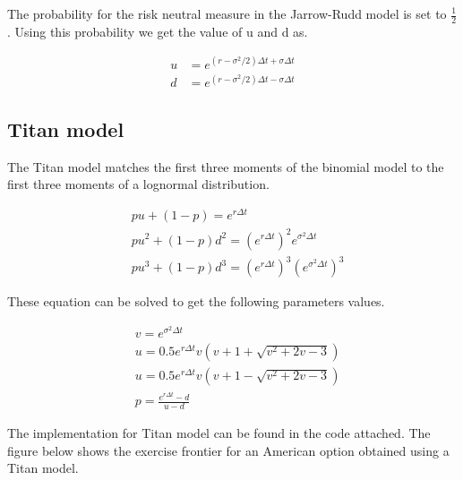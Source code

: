 \documentclass[12pt]{report}
\begin{document}
The probability for the risk neutral measure in the Jarrow-Rudd model is set to $\frac{1}{2}$. Using this probability we get the value of u and d as.

\begin{equation*}
	\begin{aligned}
		u &= e^{(r-\sigma^2/2)\Delta t + \sigma \Delta t} \\
		d &= e^{(r-\sigma^2/2)\Delta t - \sigma \Delta t}
	\end{aligned}
\end{equation*}

\subsection*{Titan model}
The Titan model matches the first three moments of the binomial model to the first three moments of a lognormal distribution.

\begin{equation*}
	\begin{aligned}
		&pu + (1-p) = e^{r\Delta t}\\
		&pu^2 + (1-p)d^2 = (e^{r\Delta t})^2 e^{\sigma^2 \Delta t}\\
		&pu^3 + (1-p)d^3= (e^{r\Delta t})^3 (e^{\sigma^2\Delta t})^3
	\end{aligned}
\end{equation*}

These equation can be solved to get the following parameters values.

\begin{equation*}
	\begin{aligned}
	&v = e^{\sigma^2\Delta t}\\
	&u = 0.5 e^{r\Delta t} v(v+1+\sqrt{v^2 +2v -3})\\
	&u = 0.5 e^{r\Delta t} v(v+1-\sqrt{v^2 +2v -3}) \\
	&p = \frac{e^{r\Delta t} -d}{u-d }
	\end{aligned}
\end{equation*}

The implementation for Titan model can be found in the code attached. The figure below shows the exercise frontier for an American option obtained using a Titan model.
\end{document}
